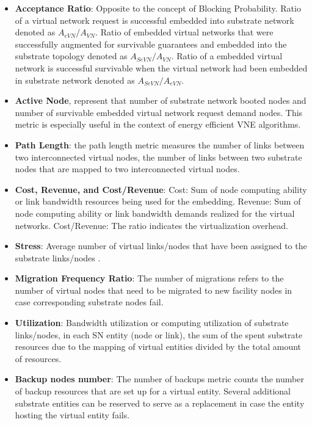 \begin{itemize}
  \item \textbf{Acceptance Ratio}: Opposite to the concept of Blocking Probability. Ratio of a virtual network request is successful embedded into substrate network denoted as $A_{eVN}/A_{VN}$. Ratio of embedded virtual networks that were successfully augmented for survivable guarantees and embedded into the substrate topology denoted as $A_{SeVN}/A_{VN}$. Ratio of a embedded virtual network is successful survivable when the virtual network had been embedded in substrate network denoted as $A_{SeVN}/A_{eVN}$.
  \item \textbf{Active Node}, represent that number of substrate network booted nodes and number of survivable embedded virtual network request demand nodes. This metric is especially useful in the context of energy efficient VNE algorithms.
  \item \textbf{Path Length}: the path length metric measures the number of links between two interconnected virtual nodes, the number of links between two substrate nodes that are mapped to two interconnected virtual nodes.

  \item \textbf{Cost, Revenue, and Cost/Revenue}: Cost: Sum of node computing ability or link bandwidth resources being used for the embedding. Revenue: Sum of node computing ability or link bandwidth demands realized for the virtual networks. Cost/Revenue: The ratio indicates the virtualization overhead.
  \item \textbf{Stress}: Average number of virtual links/nodes that have been assigned to the substrate links/nodes .
 \item \textbf{Migration Frequency Ratio}: The number of migrations refers to the number of virtual nodes that need to be migrated to new facility nodes in case corresponding substrate nodes fail.
 \item \textbf{Utilization}: Bandwidth utilization or computing utilization of substrate links/nodes, in each SN entity (node or link), the sum of the spent substrate resources due to the mapping of virtual entities divided by the total amount of resources.
 \item \textbf{Backup nodes number}: The number of backups metric counts the number of backup resources that are set up for a virtual entity. Several additional substrate entities can be reserved to serve as a replacement in case the entity hosting the virtual entity fails.
\end{itemize}
